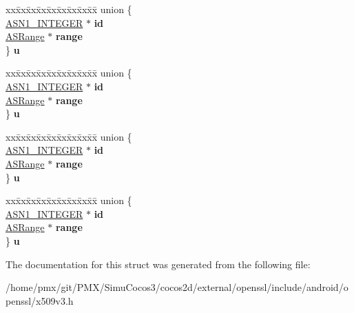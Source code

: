 \begin{DoxyCompactItemize}
\begin{tabbing}
\end{tabbing}\item 
\mbox{\label{structASIdOrRange__st_a4741c27c0952db0418ff3b64c3569489}} 
\begin{tabbing}
xx\=xx\=xx\=xx\=xx\=xx\=xx\=xx\=xx\=\kill
union \{\\
\>\hyperlink{structasn1__string__st}{ASN1\_INTEGER} $\ast$ {\bfseries id}\\
\>\hyperlink{structASRange__st}{ASRange} $\ast$ {\bfseries range}\\
\} {\bfseries u}\\

\end{tabbing}\item 
\mbox{\label{structASIdOrRange__st_a8537257412a479c4e66119f5f26220e0}} 
\begin{tabbing}
xx\=xx\=xx\=xx\=xx\=xx\=xx\=xx\=xx\=\kill
union \{\\
\>\hyperlink{structasn1__string__st}{ASN1\_INTEGER} $\ast$ {\bfseries id}\\
\>\hyperlink{structASRange__st}{ASRange} $\ast$ {\bfseries range}\\
\} {\bfseries u}\\

\end{tabbing}\item 
\mbox{\label{structASIdOrRange__st_a15624a9ce7a6ddbad7229b50e34d4c0a}} 
\begin{tabbing}
xx\=xx\=xx\=xx\=xx\=xx\=xx\=xx\=xx\=\kill
union \{\\
\>\hyperlink{structasn1__string__st}{ASN1\_INTEGER} $\ast$ {\bfseries id}\\
\>\hyperlink{structASRange__st}{ASRange} $\ast$ {\bfseries range}\\
\} {\bfseries u}\\

\end{tabbing}\item 
\mbox{\label{structASIdOrRange__st_ab5c5925a84decca1b5af95c11164ab96}} 
\begin{tabbing}
xx\=xx\=xx\=xx\=xx\=xx\=xx\=xx\=xx\=\kill
union \{\\
\>\hyperlink{structasn1__string__st}{ASN1\_INTEGER} $\ast$ {\bfseries id}\\
\>\hyperlink{structASRange__st}{ASRange} $\ast$ {\bfseries range}\\
\} {\bfseries u}\\

\end{tabbing}\end{DoxyCompactItemize}


The documentation for this struct was generated from the following file\+:\begin{DoxyCompactItemize}
\item 
/home/pmx/git/\+P\+M\+X/\+Simu\+Cocos3/cocos2d/external/openssl/include/android/openssl/x509v3.\+h\end{DoxyCompactItemize}
